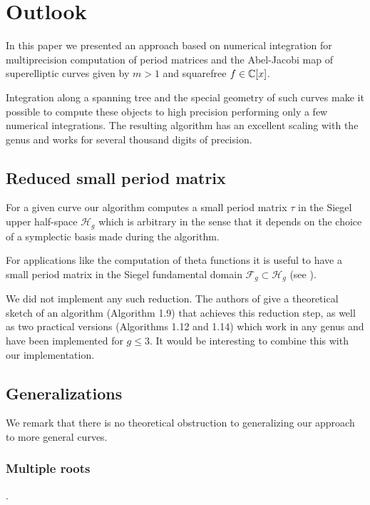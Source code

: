 \documentclass[main.tex]{subfiles}
\begin{document}
  \section{Outlook}\label{sec:outlook}

  In this paper we presented an approach based on numerical integration for
  multiprecision computation of period matrices and the Abel-Jacobi map of
  superelliptic curves given by $m > 1$ and squarefree $f \in \mathbb{C}[x]$.
 
  Integration along a spanning tree and the special geometry of such curves
  make it possible to compute these objects to high precision performing only
  a few numerical integrations. The resulting algorithm has an excellent
  scaling with the genus and works for several thousand digits of precision.

  \subsection{Reduced small period matrix}

   For a given curve our algorithm computes a small period matrix
   $\tau$ in the Siegel upper half-space $\mathcal{H}_g$ which is arbitrary
   in the sense that it depends on the choice of a symplectic basis made
   during the algorithm.
   
   For applications like the computation of theta functions it is useful to
   have a small period matrix in the Siegel fundamental domain $\mathcal{F}_g \subset
   \mathcal{H}_g$ (see \cite[\S 1.3]{PlaneQuarticsCM}).
  
   We did not implement any such reduction.
   The authors of \cite{PlaneQuarticsCM} give a theoretical sketch of
   an algorithm (Algorithm 1.9) that achieves this reduction step, as well as
   two practical versions (Algorithms 1.12 and 1.14) which work in any genus and have been implemented for $g
   \le 3$. It would be interesting to combine this with our implementation.
  
  \subsection{Generalizations}
  
  We remark that there is no theoretical obstruction to generalizing our
  approach to more general curves.
  
  \subsubsection{Multiple roots}
  \label{subsec:nonseparable}.
  
\end{document}
